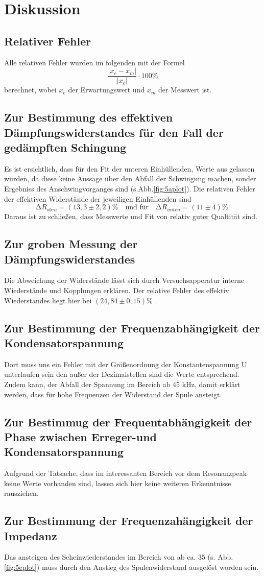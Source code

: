 \section{Diskussion}
\label{sec:Diskussion}
\subsection{Relativer Fehler}
Alle relativen Fehler wurden im folgenden mit der Formel
\begin{equation*}
  \frac{\lvert x_e - x_m \rvert}{\lvert x_e \rvert}\cdot 100 \%
\end{equation*}
berechnet, wobei $x_e$ der Erwartungswert und $ x_m$ der Messwert ist.
\subsection{Zur Bestimmung des effektiven Dämpfungswiderstandes für den Fall
der gedämpften Schingung}
  Es ist ersichtlich, dass für den Fit der unteren Einhüllenden,
  Werte aus gelassen wurden, da
  diese keine Aussage über den Abfall der Schwingung machen,
   sonder Ergebniss des Anschwingvorganges sind (s.Abb.\ref{fig:5aplot}).
  Die relativen Fehler der effektiven Widerstände der jeweiligen Einhüllenden
  sind
  \begin{equation*}
    \increment R_{oben} = (13,3 \pm 2,2) \% \quad \text{und für}\quad
    \increment R_{unten} = (11 \pm 4) \%.
  \end{equation*}
Daraus ist zu schließen, dass Messwerte und Fit von relativ guter Qualtität sind.
  \subsection{Zur groben Messung der Dämpfungswiderstandes}
  Die Abweichung der Widerstände lässt sich durch Versuchsapperatur interne
  Wiederstände und Kopplungen erklären. Der relative Fehler des effektiv Wiederstandes
  liegt hier bei
  $(24,84 \pm 0,15)\%$ .

  \subsection{Zur Bestimmung der Frequenzabhängigkeit der Kondensatorspannung }
  Dort muss uns ein Fehler mit der Größenordnung der Konstantenspannung U unterlaufen sein den außer
  der Dezimalstellen sind die Werte entsprechend. Zudem kann, der Abfall der
  Spannung im Bereich ab 45 kHz, damit erklärt werden, dass für hohe
  Frequenzen der Widerstand der Spule ansteigt.
  \subsection{Zur Bestimmug der Frequentabhängigkeit der Phase zwischen
  Erreger-und Kondensatorspannung}
    Aufgrund der Tatsache, dass im interessanten Bereich
    vor dem Resonanzpeak keine Werte vorhanden sind,
    lassen sich hier keine weiteren Erkenntnisse rausziehen.
  \subsection{Zur Bestimmung der Frequenzahängigkeit der Impedanz}
   Das ansteigen des Scheinwiederstandes im Bereich von ab ca. 35
   (s. Abb. \ref{fig:5eplot}) muss durch den Anstieg des Spulenwiderstand
   ausgelöst worden sein.
